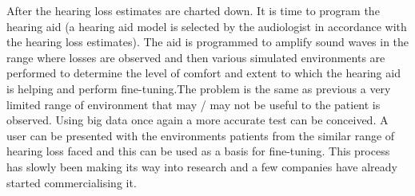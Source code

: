 \documentclass[sigconf]{acmart}
\begin{document}
\newline
After the hearing loss estimates are charted down. It is time to program the hearing aid (a hearing aid model is selected by the audiologist in accordance with the hearing loss estimates). The aid is programmed to amplify sound waves in the range where losses are observed and then various simulated environments are performed to determine the level of comfort and extent to which the hearing aid is helping and perform fine-tuning.The problem is the same as previous a very limited range of environment that may / may not be useful to the patient is observed. Using big data once again a more accurate test can be conceived. A user can be presented with the environments patients from the similar range of hearing loss faced and this can be used as a basis for fine-tuning. This process has slowly been making its way into research \cite{peternordquist2017} and a few companies \cite{phonak2017} have already started commercialising it.
\newline
\end{document}
